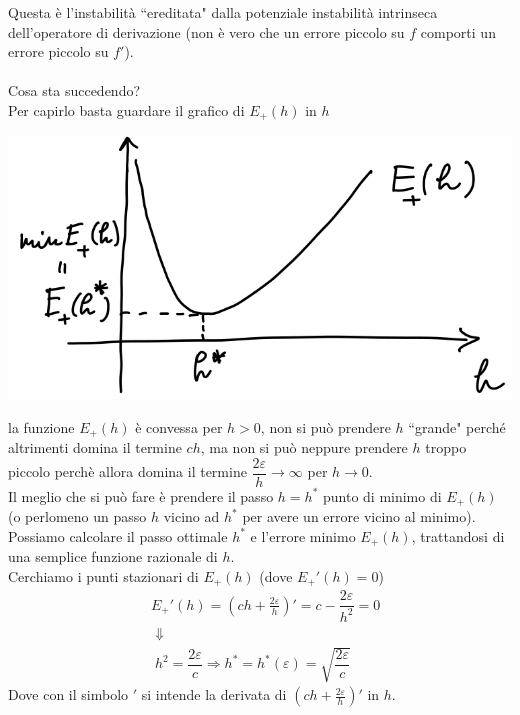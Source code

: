 \documentclass[12pt,a4paper]{article}
\begin{document}
Questa è l'instabilità ``ereditata" dalla potenziale instabilità intrinseca dell'operatore di derivazione (non è vero che
un errore piccolo su $f$ comporti un errore piccolo su $f'$).\\
\vspace{0.1cm}
\\
Cosa sta succedendo? \\
Per capirlo basta guardare il grafico di $E_+(h)$ in $h$
\begin{center}
    \includegraphics[scale=0.5]{lez17_pag15.png}    
\end{center}
la funzione $E_+(h)$ è convessa per $h>0$, non si può prendere $h$ ``grande" perché altrimenti domina il termine $ch$, ma
non si può neppure prendere $h$ troppo piccolo perchè allora domina il termine $\dfrac{2\varepsilon}{h}\to \infty$ per $h\to 0$.\\
Il meglio che si può fare è prendere il passo $h=h^*$ punto di minimo di $E_+(h)$ (o perlomeno un passo $h$ vicino ad $h^*$ per avere un errore vicino al minimo).\\
Possiamo calcolare il passo ottimale $h^*$ e l'errore minimo $E_+(h)$, trattandosi di una semplice funzione razionale di $h$.\\
Cerchiamo i punti stazionari di $E_+(h)$ (dove $E_+'(h)=0$)
\[ \begin{split}
	& E_+'(h)=\left( ch+\frac{2\varepsilon}{h}\right) ' =c-\dfrac{2\varepsilon}{h^2}=0 \\
	& \; \Downarrow \\
	& \; h^2=\dfrac{2\varepsilon}{c}\Rightarrow h^*=h^*(\varepsilon)=\sqrt{\dfrac{2\varepsilon}{c}}
\end{split} \]
Dove con il simbolo $'$ si intende la derivata di $\left( ch+\frac{2\varepsilon}{h}\right) '$ in $h$.\\
\end{document}
